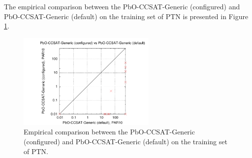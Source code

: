 \documentclass[british]{article}
\begin{document}
The empirical comparison between the PbO-CCSAT-Generic (configured) and PbO-CCSAT-Generic (default) on the training set of PTN is presented in Figure \ref{fig:configured_vs_default_train}.

\begin{figure}[htbp]
\noindent \begin{centering}
\includegraphics[width=0.6\textwidth]{data_PbO-CCSAT-Generic_configured_vs_default_on_PTN_train}
\par\end{centering}

\caption{Empirical comparison between the PbO-CCSAT-Generic (configured) and PbO-CCSAT-Generic (default) on the training set of PTN.}\label{fig:configured_vs_default_train}
\end{figure}




\end{document}
